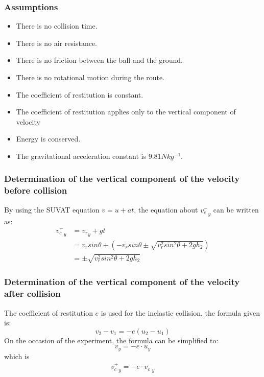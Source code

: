 \documentclass[conference]{IEEEtran}
\begin{document}
        \subsubsection{Assumptions}
            \begin{itemize}
                \item There is no collision time.
                \item There is no air resistance.
                \item There is no friction between the ball and the ground.
                \item There is no rotational motion during the route.
                \item The coefficient of restitution is constant.
                \item The coefficient of restitution applies only to the vertical component of velocity
                \item Energy is conserved.
                \item The gravitational acceleration constant is $9.81Nkg^{-1}$.
            \end{itemize}
        \subsubsection{Determination of the vertical component of the velocity before collision}
            By using the SUVAT equation $v = u + at$, the equation about ${v^-_c}_y$ can be written as:
            \begin{equation}
                \begin{aligned}
                    {v^-_c}_y &= {v_r}_y + gt\\
                    &= v_rsin\theta + (-v_{r}sin\theta\pm\sqrt{{v^2_{r}sin^2\theta}+2gh_2}) \\
                    &= \pm\sqrt{{v^2_{r}sin^2\theta}+2gh_2}
                \end{aligned}
            \end{equation}
        \subsubsection{Determination of the vertical component of the velocity after collision}
            The coefficient of restitution $e$ is used for the inelastic collision, the formula given is:
            \begin{equation}
                v_2 - v_1 = -e(u_2-u_1) \nonumber
            \end{equation}
            On the occasion of the experiment, the formula can be simplified to:
            \begin{equation} 
                v_y = -e\cdot u_y \nonumber
            \end{equation}
            which is 
            \begin{equation}
                \begin{aligned}
                    {v^+_c}_y = -e\cdot {v^-_c}_y
                \end{aligned}  
            \end{equation}
\end{document}
